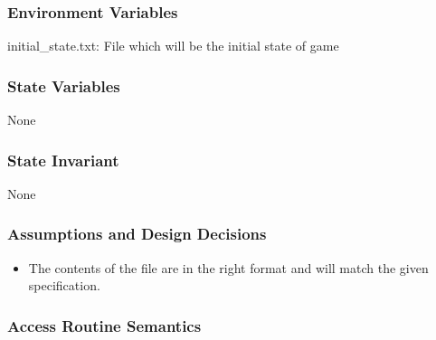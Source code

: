 \documentclass[12pt]{article}
\begin{document}
\subsubsection* {Environment Variables}

initial\_state.txt: File which will be the initial state of game

\subsubsection* {State Variables}

None

\subsubsection* {State Invariant}

None

\subsubsection* {Assumptions and Design Decisions}

\begin{itemize}
    \item The contents of the file are in the right format and will match the given specification.
\end{itemize}

\subsubsection* {Access Routine Semantics}
\end{document}
